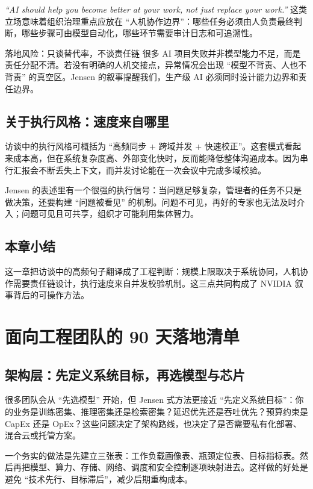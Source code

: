 \documentclass[a4paper]{article}
\begin{document}
\textit{``AI should help you become better at your work, not just replace your work.''} 这类立场意味着组织治理重点应放在 ``人机协作边界''：哪些任务必须由人负责最终判断，哪些步骤可由模型自动化，哪些环节需要审计日志和可追溯性。

\begin{warningbox}{落地风险：只谈替代率，不谈责任链}
很多 AI 项目失败并非模型能力不足，而是责任分配不清。若没有明确的人机交接点，异常情况会出现 ``模型不背责、人也不背责'' 的真空区。Jensen 的叙事提醒我们，生产级 AI 必须同时设计能力边界和责任边界。
\end{warningbox}

\subsection{关于执行风格：速度来自哪里}

访谈中的执行风格可概括为 ``高频同步 + 跨域并发 + 快速校正''。这套模式看起来成本高，但在系统复杂度高、外部变化快时，反而能降低整体沟通成本。因为串行汇报会不断丢失上下文，而并发讨论能在一次会议中完成多域校验。

Jensen 的表述里有一个很强的执行信号：当问题足够复杂，管理者的任务不只是做决策，还要构建 ``问题被看见'' 的机制。问题不可见，再好的专家也无法及时介入；问题可见且可共享，组织才可能利用集体智力。

\subsection{本章小结}

这一章把访谈中的高频句子翻译成了工程判断：规模上限取决于系统协同，人机协作需要责任链设计，执行速度来自并发校验机制。这三点共同构成了 NVIDIA 叙事背后的可操作方法。

\section{面向工程团队的 90 天落地清单}

\subsection{架构层：先定义系统目标，再选模型与芯片}

很多团队会从 ``先选模型'' 开始，但 Jensen 式方法更接近 ``先定义系统目标''：你的业务是训练密集、推理密集还是检索密集？延迟优先还是吞吐优先？预算约束是 CapEx 还是 OpEx？这些问题决定了架构路线，也决定了是否需要私有化部署、混合云或托管方案。

一个务实的做法是先建立三张表：工作负载画像表、瓶颈定位表、目标指标表。然后再把模型、算力、存储、网络、调度和安全控制逐项映射进去。这样做的好处是避免 ``技术先行、目标滞后''，减少后期重构成本。
\end{document}
